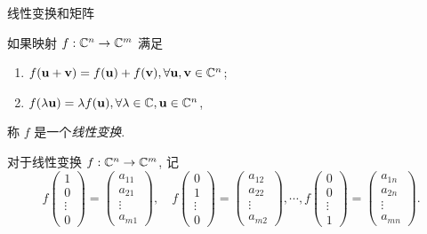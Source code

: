 \begin{frame}{线性变换和矩阵}
	\onslide<+->
	\begin{definition}
		如果映射 $f:{\mathbb{C}}^n\to{\mathbb{C}}^m$ 满足
		\begin{enumerate}
			\item $f({\mathbf{u}}+{\mathbf{v}})=f({\mathbf{u}})+f({\mathbf{v}}),\forall {\mathbf{u}},{\mathbf{v}}\in {\mathbb{C}}^n$;
			\item $f(\lambda {\mathbf{u}})=\lambda f({\mathbf{u}}),\forall \lambda\in{\mathbb{C}},{\mathbf{u}}\in {\mathbb{C}}^n$,
		\end{enumerate}
		称 $f$ 是一个\emph{线性变换}.
	\end{definition}
	\onslide<+->
	对于线性变换 $f:{\mathbb{C}}^n\to{\mathbb{C}}^m$, 记
	\[f\begin{pmatrix}
		1\\0\\\vdots\\0
	\end{pmatrix}=\begin{pmatrix}
		a_{11}\\a_{21}\\\vdots\\a_{m1}
	\end{pmatrix},\quad
	f\begin{pmatrix}
		0\\1\\\vdots\\0
	\end{pmatrix}=\begin{pmatrix}
		a_{12}\\a_{22}\\\vdots\\a_{m2}
	\end{pmatrix},\cdots,
	f\begin{pmatrix}
		0\\0\\\vdots\\1
	\end{pmatrix}=\begin{pmatrix}
		a_{1n}\\a_{2n}\\\vdots\\a_{mn}
	\end{pmatrix}.\]
\end{frame}


